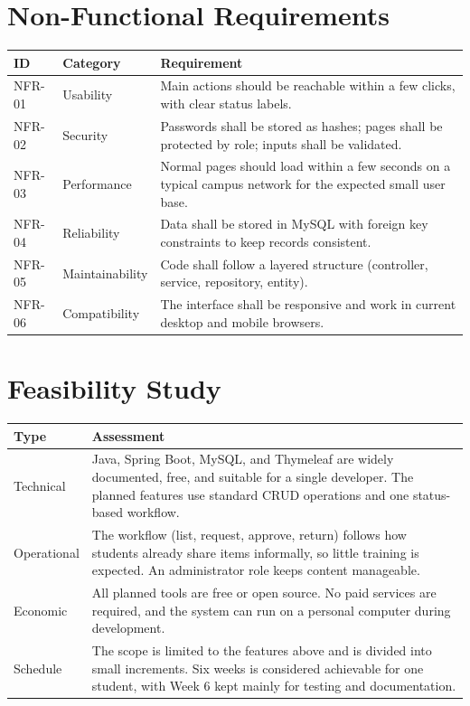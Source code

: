 \documentclass[11pt,a4paper]{article}
\begin{document}
\section{Non-Functional Requirements}
\begin{tabularx}{\textwidth}{@{}l l X@{}}
\toprule
\textbf{ID} & \textbf{Category} & \textbf{Requirement}\\
\midrule
NFR-01 & Usability & Main actions should be reachable within a few clicks, with clear status labels.\\
NFR-02 & Security & Passwords shall be stored as hashes; pages shall be protected by role; inputs shall be validated.\\
NFR-03 & Performance & Normal pages should load within a few seconds on a typical campus network for the expected small user base.\\
NFR-04 & Reliability & Data shall be stored in MySQL with foreign key constraints to keep records consistent.\\
NFR-05 & Maintainability & Code shall follow a layered structure (controller, service, repository, entity).\\
NFR-06 & Compatibility & The interface shall be responsive and work in current desktop and mobile browsers.\\
\bottomrule
\end{tabularx}

\section{Feasibility Study}
\begin{tabularx}{\textwidth}{@{}l X@{}}
\toprule
\textbf{Type} & \textbf{Assessment}\\
\midrule
Technical & Java, Spring Boot, MySQL, and Thymeleaf are widely documented, free, and suitable for a single developer. The planned features use standard CRUD operations and one status-based workflow.\\
Operational & The workflow (list, request, approve, return) follows how students already share items informally, so little training is expected. An administrator role keeps content manageable.\\
Economic & All planned tools are free or open source. No paid services are required, and the system can run on a personal computer during development.\\
Schedule & The scope is limited to the features above and is divided into small increments. Six weeks is considered achievable for one student, with Week 6 kept mainly for testing and documentation.\\
\bottomrule
\end{tabularx}
\end{document}
